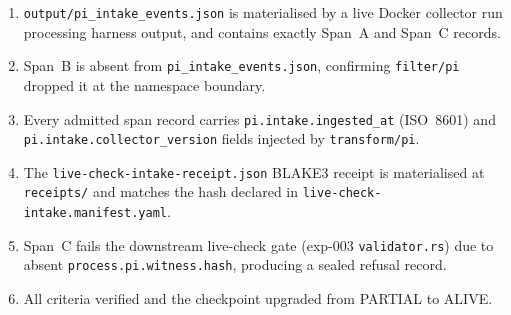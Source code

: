 \begin{enumerate}
  \item \texttt{output/pi\_intake\_events.json} is materialised by a live Docker collector
        run processing harness output, and contains exactly Span~A and Span~C records.
  \item Span~B is absent from \texttt{pi\_intake\_events.json}, confirming \texttt{filter/pi}
        dropped it at the namespace boundary.
  \item Every admitted span record carries \texttt{pi.intake.ingested\_at} (ISO~8601) and
        \texttt{pi.intake.collector\_version} fields injected by \texttt{transform/pi}.
  \item The \texttt{live-check-intake-receipt.json} BLAKE3 receipt is materialised at
        \texttt{receipts/} and matches the hash declared in
        \texttt{live-check-intake.manifest.yaml}.
  \item Span~C fails the downstream live-check gate (exp-003 \texttt{validator.rs}) due to
        absent \texttt{process.pi.witness.hash}, producing a sealed refusal record.
  \item All criteria verified and the checkpoint upgraded from PARTIAL to ALIVE.
\end{enumerate}
